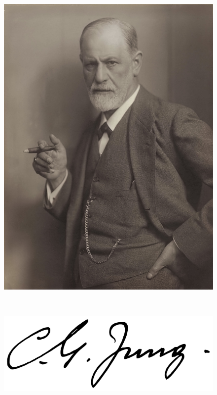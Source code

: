 \documentclass[letterpaper]{article}
\begin{document}
\begin{figure}
\begin{minipage}{0.45\textwidth}
	\end{minipage}\textwidth\begin{minipage}{0.45\textwidth}\centering
	\includegraphics[width=1.0\textwidth]{images/Sigmund_Freud.jpg}
	\end{minipage}\\
	\noindent\begin{minipage}{0.45\textwidth}\centering
	\includegraphics[width=1.0\textwidth]{images/585px-Carl_Jung_signature.png}

\end{minipage}
\end{figure}
\end{document}
